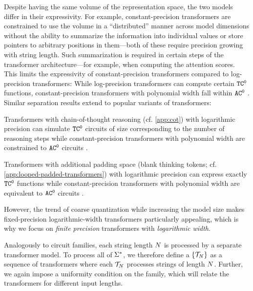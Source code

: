Despite having the same volume of the representation space, the two models differ in their expressivity.
For example, constant-precision transformers are constrained to use the volume in a ``distributed'' manner across model dimensions without the ability to summarize the information into individual values or store pointers to arbitrary positions in them---both of these require precision growing with string length.
Such summarization is required in certain steps of the transformer architecture---for example, when computing the attention scores.
This limits the expressivity of constant-precision transformers compared to log-precision transformers: While log-precision transformers can compute certain ${{{{{{\mathtt{TC}}}^{\mathtt{0}}}}}}$ functions, constant-precision transformers with polynomial width fall within ${{{{{{\mathtt{AC}}}^{\mathtt{0}}}}}}$ \citep{li2024chain,london2025pausetokensstrictlyincrease}.
Similar separation results extend to popular variants of transformers:
\begin{enumerate*}[label=(\alph*)]
   \item Transformers with chain-of-thought reasoning (cf. \cref{app:cot}) with logarithmic precision can simulate ${{{{{{\mathtt{TC}}}^{\mathtt{0}}}}}}$ circuits of size corresponding to the number of reasoning steps while constant-precision transformers with polynomial width are constrained to ${{{{{{\mathtt{AC}}}^{\mathtt{0}}}}}}$ circuits \citep{li2024chain,merrill2024the}.
   \item Transformers with additional padding space (blank thinking tokens; cf. \cref{app:looped-padded-transformers}) with logarithmic precision can express exactly ${{{{{{\mathtt{TC}}}^{\mathtt{0}}}}}}$ functions while constant-precision transformers with polynomial width are equivalent to ${{{{{{\mathtt{AC}}}^{\mathtt{0}}}}}}$ circuits \citep{merrill2025exactexpressivepowertransformers,london2025pausetokensstrictlyincrease}.
\end{enumerate*}
However, the trend of coarse quantization while increasing the model size makes fixed-precision logarithmic-width transformers particularly appealing, which is why we focus on \emph{finite precision} transformers with \emph{logarithmic width}.

Analogously to circuit families, each string length ${{N}}$ is processed by a separate transformer model.
To process all of ${{{{{{\Sigma}}^{*}}}}}$, we therefore define a  $\{{{\mathcal{T}}}_{{N}}\}$ as a sequence of transformers where each ${{\mathcal{T}}}_{{N}}$ processes strings of length ${{N}}$.
Further, we again impose a uniformity condition on the family, which will relate the transformers for different input lengths.

